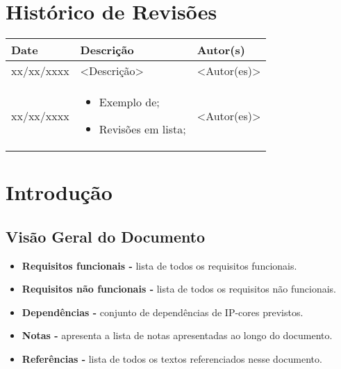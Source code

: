 \documentclass{article}
\begin{document}

\capa
\newpage

\section*{\center Histórico de Revisões}
  \vspace*{1cm}
  \begin{table}[ht]
    \centering
    \begin{tabular}[pos]{|m{2cm} | m{7.2cm} | m{3.8cm}|} 
      \hline
      \cellcolor[gray]{0.9}
      \textbf{Date} & \cellcolor[gray]{0.9}\textbf{Descrição} & \cellcolor[gray]{0.9}\textbf{Autor(s)}\\ \hline
      \hline
      \small xx/xx/xxxx & \small <Descrição> & \small <Autor(es)> \\ \hline      
      \small xx/xx/xxxx &
      \begin{small}
        \begin{itemize}
          \item Exemplo de;
          \item Revisões em lista;
        \end{itemize}
      \end{small} & \small <Autor(es)> \\ \hline 
    \end{tabular}
  \end{table}

\newpage

\tableofcontents
\newpage

\section{Introdução}

\subsection{Visão Geral do Documento}
  \begin{itemize}
   \item \textbf{Requisitos funcionais -} lista de todos os requisitos funcionais.
   \item \textbf{Requisitos não funcionais -} lista de todos os requisitos não funcionais.
   \item \textbf{Dependências -} conjunto de dependências de IP-cores previstos.
   \item \textbf{Notas -} apresenta a lista de notas apresentadas ao longo do documento.
   \item \textbf{Referências -} lista de todos os textos referenciados nesse documento.
  \end{itemize}
\end{document}
